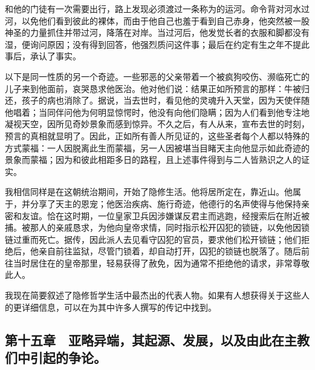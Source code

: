 和他的门徒有一次需要出行，路上发现必须渡过一条称为的运河。命令背对河水过河，以免他们看到彼此的裸体，而由于他自己也羞于看到自己赤身，他突然被一股神圣的力量抓住并带过河，降落在对岸。当过河后，他发觉长者的衣服和脚都没有湿，便询问原因；没有得到回答，他强烈质问这件事；最后在约定有生之年不提此事后，承认了事实。\par

以下是同一性质的另一个奇迹。一些邪恶的父亲带着一个被疯狗咬伤、濒临死亡的儿子来到他面前，哀哭恳求他医治。他对他们说：结果正如所预言的那样：牛被归还，孩子的病也消除了。据说，当去世时，看见他的灵魂升入天堂，因为天使伴随他唱着；当同伴问他为何明显惊愕时，他没有向他们隐瞒；因为人们看到他专注地凝视天空，因所见奇妙景象而感到惊异。不久之后，有人从来，宣布去世的时刻，预言的真相就显明了。因此，正如所有善人所见证的，这些圣者每个人都以特殊的方式蒙福：一人因脱离此生而蒙福，另一人因被堪当目睹天主向他显示如此奇迹的景象而蒙福；因为和彼此相距多日的路程，且上述事件得到与二人皆熟识之人的证实。\par

我相信同样是在这朝统治期间，开始了隐修生活。他将居所定在，靠近山。他属于，并分享了天主的恩宠；他医治疾病、施行奇迹，他德行的名声使得与他保持亲密和友谊。恰在这时期，一位皇家卫兵因涉嫌谋反君主而逃跑，经搜索后在附近被捕。被那人的亲戚恳求，为他向皇帝求情，同时指示松开囚犯的锁链，以免他因锁链过重而死亡。据传，因此派人去见看守囚犯的官员，要求他们松开锁链；他们拒绝后，他亲自前往监狱，尽管门锁着，却自动打开，囚犯的锁链也脱落了。随后前往当时居住在的皇帝那里，轻易获得了赦免，因为通常不拒绝他的请求，非常尊敬此人。\par

我现在简要叙述了隐修哲学生活中最杰出的代表人物。如果有人想获得关于这些人的更详细信息，可以在为其中许多人撰写的传记中找到。\par


\subsection{第十五章　亚略异端，其起源、发展，以及由此在主教们中引起的争论。}

